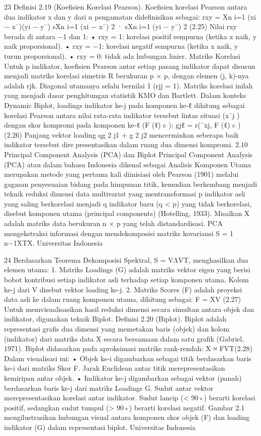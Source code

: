 23
Definisi 2.19 (Koefisien Korelasi Pearson). Koefisien korelasi Pearson antara dua indikator
x dan y dari n pengamatan didefinisikan sebagai:
rxy =
Xn
i=1
(xi − x¯)(yi − y¯)
sXn
i=1
(xi − x¯)
2
·
sXn
i=1
(yi − y¯)
2
(2.25)
Nilai rxy berada di antara −1 dan 1:
• rxy = 1: korelasi positif sempurna (ketika x naik, y naik proporsional).
• rxy = −1: korelasi negatif sempurna (ketika x naik, y turun proporsional).
• rxy = 0: tidak ada hubungan linier.
Matriks Korelasi Untuk p indikator, koefisien Pearson antar setiap pasang indikator dapat
disusun menjadi matriks korelasi simetris R berukuran p × p, dengan elemen (j, k)-nya
adalah rjk. Diagonal utamanya selalu bernilai 1 (rjj = 1). Matriks korelasi inilah yang
menjadi dasar penghitungan statistik KMO dan Bartlett.
Dalam konteks Dynamic Biplot, loadings indikator ke-j pada komponen ke-ℓ dihitung
sebagai korelasi Pearson antara nilai rata-rata indikator tersebut lintas situasi (x¯j ) dengan
skor kompromi pada komponen ke-ℓ (F
(ℓ)
c ):
gjℓ = r(¯xj, F
(ℓ)
c
) (2.26)
Panjang vektor loading qg
2
j1 + g
2
j2 mencerminkan seberapa baik indikator tersebut direpresentasikan dalam ruang dua dimensi kompromi.
2.10 Principal Component Analysis (PCA) dan Biplot
Principal Component Analysis (PCA) atau dalam bahasa Indonesia dikenal sebagai
Analisis Komponen Utama merupakan metode yang pertama kali diinisiasi oleh Pearson
(1901) melalui gagasan penyesuaian bidang pada himpunan titik, kemudian berkembang
menjadi teknik reduksi dimensi data multivariat yang mentransformasi p indikator asli
yang saling berkorelasi menjadi q indikator baru (q < p) yang tidak berkorelasi, disebut
komponen utama (principal components) (Hotelling, 1933).
Misalkan X adalah matriks data berukuran n × p yang telah distandardisasi. PCA
mengekstraksi informasi dengan mendekomposisi matriks kovariansi S =
1
n−1XTX.
Universitas Indonesia

24
Berdasarkan Teorema Dekomposisi Spektral, S = VΛVT, menghasilkan dua elemen
utama:
1. Matriks Loadings (G) adalah matriks vektor eigen yang berisi bobot kontribusi
setiap indikator asli terhadap setiap komponen utama. Kolom ke-j dari V disebut
vektor loading ke-j.
2. Matriks Scores (F) adalah proyeksi data asli ke dalam ruang komponen utama,
dihitung sebagai:
F = XV (2.27)
Untuk memvisualisasikan hasil reduksi dimensi secara simultan antara objek dan
indikator, digunakan teknik Biplot.
Definisi 2.20 (Biplot). Biplot adalah representasi grafis dua dimensi yang memetakan baris
(objek) dan kolom (indikator) dari matriks data X secara bersamaan dalam satu grafik
(Gabriel, 1971). Biplot didasarkan pada aproksimasi matriks rank-rendah:
X ≈ FVT(2.28)
Dalam visualisasi ini:
• Objek ke-i digambarkan sebagai titik berdasarkan baris ke-i dari matriks Skor F.
Jarak Euclidean antar titik merepresentasikan kemiripan antar objek.
• Indikator ke-j digambarkan sebagai vektor (panah) berdasarkan baris ke-j dari
matriks Loadings G. Sudut antar vektor merepresentasikan korelasi antar indikator.
Sudut lancip (< 90◦) berarti korelasi positif, sedangkan sudut tumpul (> 90◦) berarti
korelasi negatif.
Gambar 2.1 mengilustrasikan hubungan visual antara komponen skor objek (F) dan
loading indikator (G) dalam representasi biplot.
Universitas Indonesia

